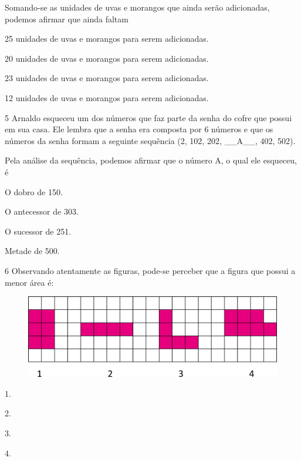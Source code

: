 Somando-se as unidades de uvas e morangos que ainda serão adicionadas, podemos afirmar que ainda faltam

\begin{escolha}
\item
  25 unidades de uvas e morangos para serem adicionadas.
\item
  20 unidades de uvas e morangos para serem adicionadas.
\item
  23 unidades de uvas e morangos para serem adicionadas.
\item
  12 unidades de uvas e morangos para serem adicionadas.
\end{escolha}


\num{5} Arnaldo esqueceu um dos números que faz parte da senha do cofre que
possui em sua casa. Ele lembra que a senha era composta por 6 números e
que os números da senha formam a seguinte sequência (2, 102, 202,
\_\_A\_\_, 402, 502).

Pela análise da sequência, podemos afirmar que o número A, o qual ele esqueceu, é

\begin{multicols}{2}
\begin{escolha}
\item
  O dobro de 150.
\item
  O antecessor de 303.
\item
  O sucessor de 251.
\item
  Metade de 500.
\end{escolha}
\end{multicols}

\pagebreak
\num{6} Observando atentamente as figuras, pode-se perceber que a figura que possui a menor área é:

\begin{figure}[htpb!]
\centering
\includegraphics[width=\textwidth]{./media/image115.png}
\end{figure}

\begin{escolha}
\item
  1.
\item
  2.
\item
  3.
\item
  4.
\end{escolha}


